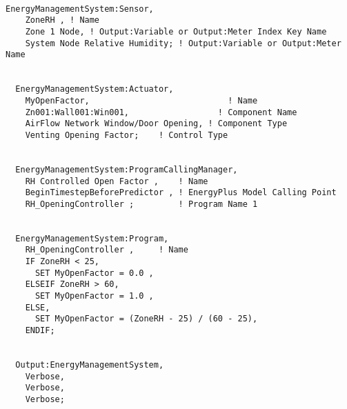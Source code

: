 \begin{lstlisting}

EnergyManagementSystem:Sensor,
    ZoneRH , ! Name
    Zone 1 Node, ! Output:Variable or Output:Meter Index Key Name
    System Node Relative Humidity; ! Output:Variable or Output:Meter Name


  EnergyManagementSystem:Actuator,
    MyOpenFactor,                            ! Name
    Zn001:Wall001:Win001,                  ! Component Name
    AirFlow Network Window/Door Opening, ! Component Type
    Venting Opening Factor;    ! Control Type


  EnergyManagementSystem:ProgramCallingManager,
    RH Controlled Open Factor ,    ! Name
    BeginTimestepBeforePredictor , ! EnergyPlus Model Calling Point
    RH_OpeningController ;         ! Program Name 1


  EnergyManagementSystem:Program,
    RH_OpeningController ,     ! Name
    IF ZoneRH < 25,
      SET MyOpenFactor = 0.0 ,
    ELSEIF ZoneRH > 60,
      SET MyOpenFactor = 1.0 ,
    ELSE,
      SET MyOpenFactor = (ZoneRH - 25) / (60 - 25),
    ENDIF;


  Output:EnergyManagementSystem,
    Verbose,
    Verbose,
    Verbose;
\end{lstlisting}

